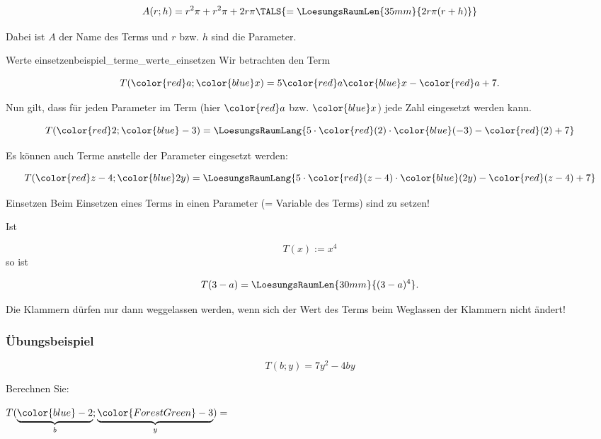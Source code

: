 $$A(r; h) = r^2\pi + r^2\pi + 2r\pi{} \TALS{ = \LoesungsRaumLen{35mm}{2r\pi(r+h)}}$$

Dabei ist $A$ der Name des Terms und $r$ bzw. $h$ sind die Parameter.
\vspace{3mm}
\begin{beispiel}{Werte einsetzen}{beispiel_terme_werte_einsetzen}
  Wir betrachten den Term

  $$T({\color{red}a}; {\color{blue}x}) = 5{\color{red}a}{\color{blue}x} - {\color{red}a} + 7.$$

  Nun gilt, dass für jeden Parameter im Term (hier ${\color{red}a}$
  bzw. ${\color{blue}x}$) jede Zahl eingesetzt
  werden kann.\leserluft{}

  $$T({\color{red}2}; {\color{blue}-3}) = \LoesungsRaumLang{5\cdot{}{\color{red}(2)}\cdot{\color{blue}(-3)} - {\color{red}(2)} + 7}$$

  Es können auch Terme anstelle der Parameter eingesetzt
  werden:\leserluft{}

  $$T({\color{red}z-4}; {\color{blue}2y}) =
  \LoesungsRaumLang{5 \cdot{} {\color{red}(z-4)} \cdot {\color{blue}(2y)} - {\color{red}(z-4)} + 7}$$
\end{beispiel}

\begin{gesetz}{Einsetzen}{}
  Beim Einsetzen eines Terms in einen
  Parameter (= Variable des Terms) sind  zu setzen!

  Ist
  
  $$ T(x) := x^4$$
  so ist
  
  $$ T(3-a) = \LoesungsRaumLen{30mm}{(3-a)^4}.$$
  
Die Klammern dürfen nur dann weggelassen werden, wenn sich der Wert
des Terms beim Weglassen der Klammern nicht ändert!
\end{gesetz}
\newpage

\subsubsection{Übungsbeispiel}
$$T(b; y) = 7y^2 - 4by$$

Berechnen Sie:


$T(\underbrace{{\color{blue}-2}}_b; \underbrace{{\color{ForestGreen}-3}}_y) = $%




